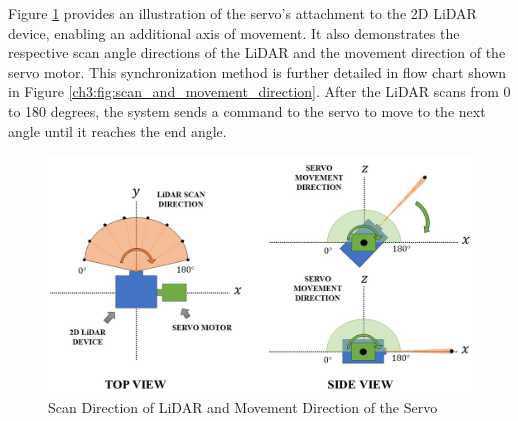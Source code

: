 
Figure \ref{ch3:fig:servo_lidar_comm} provides an illustration of the servo's attachment to the 2D LiDAR device, enabling an additional axis of movement. It also demonstrates the respective scan angle directions of the LiDAR and the movement direction of the servo motor. This synchronization method is further detailed in flow chart shown in Figure \ref{ch3:fig:scan_and_movement_direction}. After the LiDAR scans from 0 to 180 degrees, the system sends a command to the servo to move to the next angle until it reaches the end angle. %
\\
\begin{figure}[H]
	\centering
	\includegraphics[width=1\textwidth]{Figures/scan_direction_of_lidar_and_servo}
	\caption{Scan Direction of LiDAR and Movement Direction of the Servo}
	\label{ch3:fig:servo_lidar_comm}
\end{figure}


